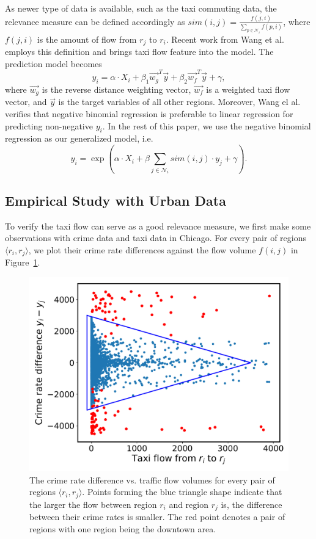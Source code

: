 As newer type of data is available, such as the taxi commuting data, the relevance measure can be defined accordingly as $sim(i,j) = \frac{f(j,i)}{\sum_{p \in \mathcal{N}_i} f(p,i)}$, where $f(j,i)$ is the amount of flow from $r_j$ to $r_i$.
Recent work from Wang et al.~\cite{wang2016crime} employs this definition and brings taxi flow feature into the model. The prediction model becomes 
\begin{equation}
\label{eq:gim}
y_i = \alpha \cdot X_i + \beta_1 \vec{w_g}^T \vec{y} + \beta_2 \vec{w_f}^T \vec{y} + \gamma,
\end{equation}
where $\vec{w_g}$ is the reverse distance weighting vector, $\vec{w_f}$ is a weighted taxi flow vector, and $\vec{y}$ is the target variables of all other regions. Moreover, Wang el al.~\cite{wang2016crime} verifies that negative binomial regression is preferable to linear regression for predicting non-negative $y_i$. In the rest of this paper, we use the negative binomial regression as our generalized model, i.e.  
\begin{equation}
\label{eq:nbr}
y_i = \exp (\alpha \cdot X_i + \beta \sum_{j \in \mathcal{N}_i} sim(i,j) \cdot y_j + \gamma).
\end{equation}


\subsection{Empirical Study with Urban Data}

To verify the taxi flow can serve as a good relevance measure, we first make some observations with crime data and taxi data in Chicago. For every pair of regions $\langle r_i, r_j \rangle$, we plot their crime rate differences against the flow volume $f(i,j)$ in Figure~\ref{fig:prelm}.

\begin{figure}[h]
\centering
\includegraphics[width=0.6\linewidth]{fig/crime-flow-preliminary.pdf}
\caption{The crime rate difference vs. traffic flow volumes for every pair of regions $\langle r_i, r_j \rangle$. Points forming the blue triangle shape indicate that the larger the flow between region $r_i$ and region $r_j$ is, the difference between their crime rates is smaller. The red point denotes a pair of regions with one region being the downtown area.}
\label{fig:prelm}
\end{figure}

